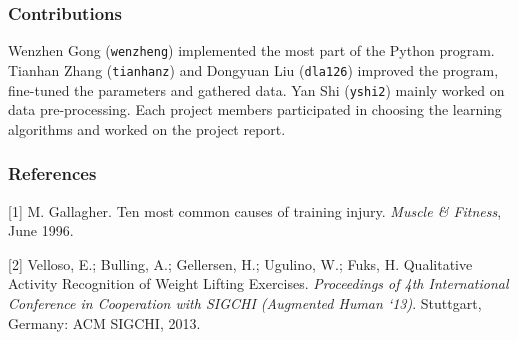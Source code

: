 \documentclass{article} %
\begin{document}
\subsubsection*{Contributions}

Wenzhen Gong (\texttt{wenzheng}) implemented the most part of the Python program. Tianhan Zhang (\texttt{tianhanz}) and Dongyuan Liu (\texttt{dla126}) improved the program, fine-tuned the parameters and gathered data. Yan Shi (\texttt{yshi2}) mainly worked on data pre-processing. Each project members participated in choosing the learning algorithms and worked on the project report.

\subsubsection*{References}

\small{
[1] M. Gallagher. Ten most common causes of training injury. {\it Muscle \& Fitness}, June 1996.

[2] Velloso, E.; Bulling, A.; Gellersen, H.; Ugulino, W.; Fuks, H. Qualitative Activity Recognition of Weight Lifting Exercises. {\it Proceedings of 4th International Conference in Cooperation with SIGCHI (Augmented Human `13)}. Stuttgart, Germany: ACM SIGCHI, 2013.
}
\end{document}

